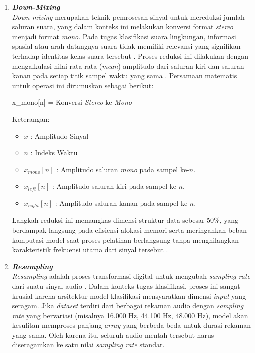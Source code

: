 \begin{enumerate}
	\item \textbf{\textit{Down-Mixing}} \\
	\textit{Down-mixing} merupakan teknik pemrosesan sinyal untuk mereduksi jumlah saluran suara, yang dalam konteks ini melakukan konversi format \textit{stereo} menjadi format \textit{mono}. 
	Pada tugas klasifikasi suara lingkungan, informasi spasial atau arah datangnya suara tidak memiliki relevansi yang signifikan terhadap identitas kelas suara tersebut \cite{kong2020panns}.
	Proses reduksi ini dilakukan dengan mengalkulasi nilai rata-rata (\textit{mean}) amplitudo dari saluran kiri dan saluran kanan pada setiap titik sampel waktu yang sama \cite{li2014fundamentals}.
	Persamaan matematis untuk operasi ini dirumuskan sebagai berikut:
    
  \begin{equationcaptioned}{
      x_{mono}[n] = 
      \label{eq:channel_convert}
  }{
      Konversi \textit{Stereo} ke \textit{Mono}
  }
  \end{equationcaptioned}

  \noindent Keterangan:
  \begin{itemize}
      \item $x$ : Amplitudo Sinyal
      \item $n$ : Indeks Waktu
      \item $x_{mono}[n]$ : Amplitudo saluran \textit{mono} pada sampel ke-$n$.
      \item $x_{left}[n]$ : Amplitudo saluran kiri pada sampel ke-$n$.
      \item $x_{right}[n]$ : Amplitudo saluran kanan pada sampel ke-$n$.
  \end{itemize}
  \medskip

	Langkah reduksi ini memangkas dimensi struktur data sebesar 50\%, yang berdampak langsung pada efisiensi alokasi memori serta meringankan beban komputasi model saat proses pelatihan berlangsung tanpa menghilangkan karakteristik frekuensi utama dari sinyal tersebut \cite{kong2020panns}. \par
	
	\item \textbf{\textit{Resampling}} \\
	\textit{Resampling} adalah proses transformasi digital untuk mengubah \textit{sampling rate} dari suatu sinyal audio \cite{oppenheim2010discrete}.
	Dalam konteks tugas klasifikasi, proses ini sangat krusial karena arsitektur model klasifikasi mensyaratkan dimensi \textit{input} yang seragam.
	Jika \textit{dataset} terdiri dari berbagai rekaman audio dengan \textit{sampling rate} yang bervariasi (misalnya 16.000 Hz, 44.100 Hz, 48.000 Hz), model akan kesulitan memproses panjang \textit{array} yang berbeda-beda untuk durasi rekaman yang sama. 
	Oleh karena itu, seluruh audio mentah tersebut harus diseragamkan ke satu nilai \textit{sampling rate} standar. \par
	

\end{enumerate}
